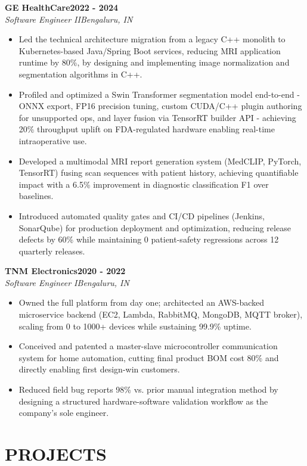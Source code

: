 \documentclass[letterpaper,10pt]{article}
\newcommand{\experience}[4]{%
  \noindent\textbf{#1}\hfill\textbf{#2}\\
  \textit{#3}\hfill\textit{#4}\par\vspace{-2pt}
}
\begin{document}
\experience{GE HealthCare}{2022 - 2024}{Software Engineer II}{Bengaluru, IN}
\begin{itemize}
    \item Led the technical architecture migration from a legacy C++ monolith to Kubernetes-based Java/Spring Boot services, reducing MRI application runtime by 80\%, by designing and implementing image normalization and segmentation algorithms in C++.
    \item Profiled and optimized a Swin Transformer segmentation model end-to-end - ONNX export, FP16 precision tuning, custom CUDA/C++ plugin authoring for unsupported ops, and layer fusion via TensorRT builder API - achieving 20\% throughput uplift on FDA-regulated hardware enabling real-time intraoperative use.
    \item Developed a multimodal MRI report generation system (MedCLIP, PyTorch, TensorRT) fusing scan sequences with patient history, achieving quantifiable impact with a 6.5\% improvement in diagnostic classification F1 over baselines.
    \item Introduced automated quality gates and CI/CD pipelines (Jenkins, SonarQube) for production deployment and optimization, reducing release defects by 60\% while maintaining 0 patient-safety regressions across 12 quarterly releases.
\end{itemize}

\experience{TNM Electronics}{2020 - 2022}{Software Engineer I}{Bengaluru, IN}
\begin{itemize}
    \item Owned the full platform from day one; architected an AWS-backed microservice backend (EC2, Lambda, RabbitMQ, MongoDB, MQTT broker), scaling from 0 to 1000+ devices while sustaining 99.9\% uptime.
    \item Conceived and patented a master-slave microcontroller communication system for home automation, cutting final product BOM cost 80\% and directly enabling first design-win customers.
    \item Reduced field bug reports 98\% vs. prior manual integration method by designing a structured hardware-software validation workflow as the company's sole engineer.
\end{itemize}

\section*{PROJECTS}
\end{document}
